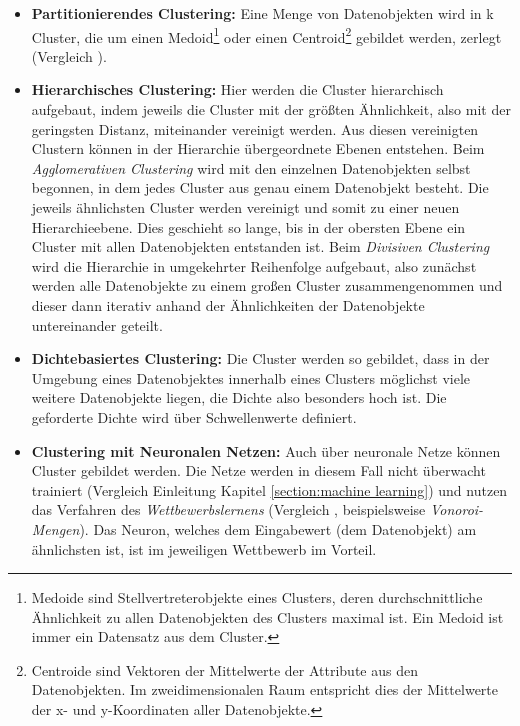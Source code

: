 \begin{itemize}
		\item \textbf{Partitionierendes Clustering:} Eine Menge von Datenobjekten wird in k Cluster, die um einen Medoid\footnote{Medoide sind Stellvertreterobjekte eines Clusters, deren durchschnittliche Ähnlichkeit zu allen Datenobjekten des Clusters maximal ist. Ein Medoid ist immer ein Datensatz aus dem Cluster.} oder einen Centroid\footnote{Centroide sind Vektoren der Mittelwerte der Attribute aus den Datenobjekten. Im zweidimensionalen Raum entspricht dies der Mittelwerte der x- und y-Koordinaten aller Datenobjekte.} gebildet werden, zerlegt (Vergleich ). 
		\item \textbf{Hierarchisches Clustering:} Hier werden die Cluster hierarchisch aufgebaut, indem jeweils die Cluster mit der größten Ähnlichkeit, also mit der geringsten Distanz, miteinander vereinigt werden. Aus diesen vereinigten Clustern können in der Hierarchie übergeordnete Ebenen entstehen. Beim \textit{Agglomerativen Clustering} wird mit den einzelnen Datenobjekten selbst begonnen, in dem jedes Cluster aus genau einem Datenobjekt besteht. Die jeweils ähnlichsten Cluster werden vereinigt und somit zu einer neuen Hierarchieebene. Dies geschieht so lange, bis in der obersten Ebene ein Cluster mit allen Datenobjekten entstanden ist. Beim \textit{Divisiven Clustering} wird die Hierarchie in umgekehrter Reihenfolge aufgebaut, also zunächst werden alle Datenobjekte zu einem großen Cluster zusammengenommen und dieser dann iterativ anhand der  Ähnlichkeiten der Datenobjekte untereinander geteilt.  
		\item \textbf{Dichtebasiertes Clustering:} Die Cluster werden so gebildet, dass in der Umgebung eines Datenobjektes innerhalb eines Clusters möglichst viele weitere Datenobjekte liegen, die Dichte also besonders hoch ist. Die geforderte Dichte wird über Schwellenwerte definiert. 
		\item \textbf{Clustering mit Neuronalen Netzen:} Auch über neuronale Netze können Cluster gebildet werden. Die Netze werden in diesem Fall nicht überwacht trainiert (Vergleich Einleitung Kapitel \ref{section:machine learning}) und nutzen das Verfahren des \textit{Wettbewerbslernens} (Vergleich , beispielsweise \textit{Vonoroi-Mengen}). Das Neuron, welches dem Eingabewert (dem Datenobjekt) am ähnlichsten ist, ist im jeweiligen Wettbewerb im Vorteil. 
\end{itemize}	

\newpage

